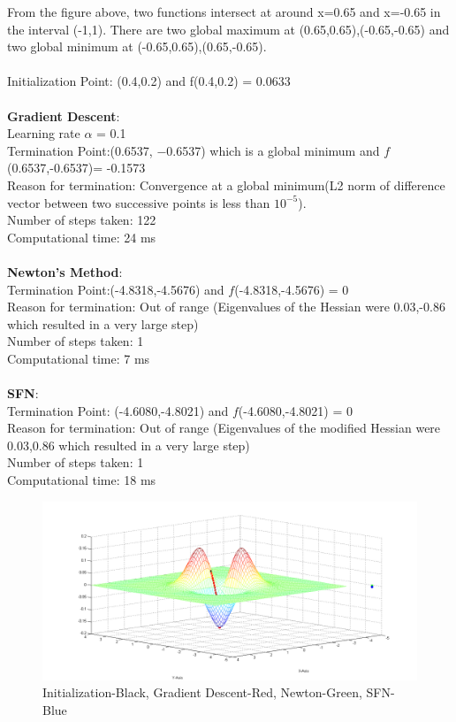 From the figure above, two functions intersect at around x=0.65 and x=-0.65 in the
interval (-1,1). There are two global maximum at (0.65,0.65),(-0.65,-0.65) and two global
minimum at (-0.65,0.65),(0.65,-0.65).
\\
\\Initialization Point: (0.4,0.2) and f(0.4,0.2) = 0.0633
\\\\
\textbf{Gradient Descent}:
\\Learning rate $\alpha$ = 0.1
\\Termination Point:(0.6537, −0.6537) which is a global minimum and $f$(0.6537,-0.6537)= -0.1573
\\Reason for termination: Convergence at a global minimum(L2 norm of difference vector between two successive points is less than $10^{-5}$).
\\Number of steps taken: 122
\\Computational time: 24 ms
\\\\
\textbf{Newton’s Method}: 
\\Termination Point:(-4.8318,-4.5676) and $f$(-4.8318,-4.5676) = 0
\\Reason for termination: Out of range (Eigenvalues of the Hessian were 0.03,-0.86 which resulted in a very large step)
\\Number of steps taken: 1
\\Computational time: 7 ms
\\\\
\textbf{SFN}: 
\\Termination Point: (-4.6080,-4.8021) and $f$(-4.6080,-4.8021) = 0
\\Reason for termination: Out of range (Eigenvalues of the modified Hessian were 0.03,0.86 which resulted in a very large step)
\\Number of steps taken: 1
\\Computational time: 18 ms

\begin{figure}[H]
\includegraphics[scale = 0.5]{4.png}
\caption{Initialization-Black, Gradient Descent-Red, Newton-Green, SFN-Blue}
\end{figure}

